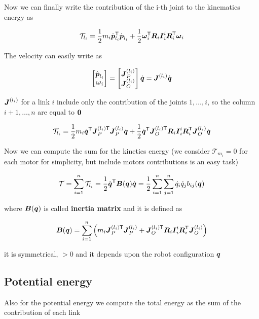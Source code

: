 Now we can finally write the contribution of the i-th joint to the kinematics energy as

\[
	\mathcal{T}_{l_i} =
	\frac{1}{2} m_i \dot{\boldsymbol{p}}_{l_i}^{\mathsf{T}} \dot{\boldsymbol{p}}_{l_i} +
	\frac{1}{2} \boldsymbol{\omega}_i^{\mathsf{T}} \boldsymbol{R}_i \boldsymbol{I}_i^i \boldsymbol{R}_i^{\mathsf{T}} \boldsymbol{\omega}_i
\]

The velocity can easily write as

\[
	\begin{bmatrix}
		\dot{\boldsymbol{p}}_{l_i} \\
		\boldsymbol{\omega}_i
	\end{bmatrix} =
	\begin{bmatrix}
		\boldsymbol{J}_P^{(l_i)} \\
		\boldsymbol{J}_O^{(l_i)}
	\end{bmatrix} \dot{\boldsymbol{q}} =
	\boldsymbol{J}^{(l_i)} \dot{\boldsymbol{q}}
\]

\begin{nb}$\boldsymbol{J}^{(l_i)}$ for a link $i$ include only the contribution of the joints $1, \dots, i$, so the column $i+1,\dots,n$ are equal to $\boldsymbol{0}$\end{nb}

\[
	\mathcal{T}_{l_i} =
	\frac{1}{2} m_i \dot{\boldsymbol{q}}^{\mathsf{T}} \boldsymbol{J}_P^{(l_i)\mathsf{T}} \boldsymbol{J}_P^{(l_i)} \dot{\boldsymbol{q}} +
	\frac{1}{2} \dot{\boldsymbol{q}}^{\mathsf{T}} \boldsymbol{J}_O^{(l_i)\mathsf{T}} \boldsymbol{R}_i \boldsymbol{I}_i^i \boldsymbol{R}_i^{\mathsf{T}} \boldsymbol{J}_O^{(l_i)} \dot{\boldsymbol{q}}
\]

Now we can compute the sum for the kinetics energy (we consider $\mathcal{T}_{m_i} = 0$ for each motor for simplicity, but include motors contributions is an easy task)

\[
	\mathcal{T} =
	\sum_{i=1}^n \mathcal{T}_{l_i} =
	\frac{1}{2} \dot{\boldsymbol{q}}^{\mathsf{T}} \boldsymbol{B}(\boldsymbol{q}) \dot{\boldsymbol{q}} =
	\frac{1}{2} \sum_{i=1}^n \sum_{j=1}^n \dot{q}_i \dot{q}_j b_{ij}(\boldsymbol{q})
\]

where $\boldsymbol{B}(\boldsymbol{q})$ is called \textbf{inertia matrix} and it is defined as

\[
	\boldsymbol{B}(\boldsymbol{q}) = \sum_{i=1}^n \left(
	m_i \boldsymbol{J}_P^{(l_i)\mathsf{T}} \boldsymbol{J}_P^{(l_i)} +
	\boldsymbol{J}_O^{(l_i)\mathsf{T}} \boldsymbol{R}_i \boldsymbol{I}_i^i \boldsymbol{R}_i^{\mathsf{T}} \boldsymbol{J}_O^{(l_i)}
	\right)
\]

it is symmetrical, $> 0$ and it depends upon the robot configuration $\boldsymbol{q}$

\subsection{Potential energy}

Also for the potential energy we compute the total energy as the sum of the contribution of each link

